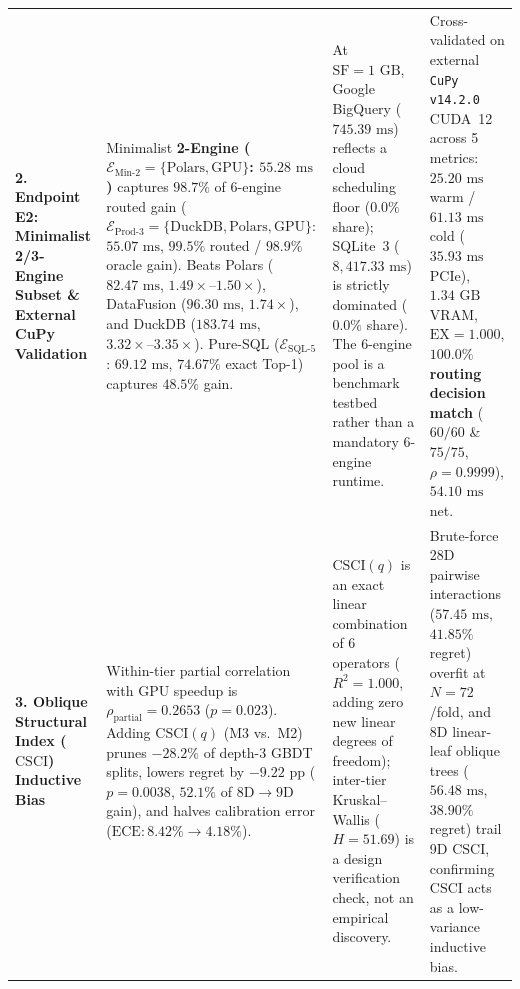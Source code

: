 \documentclass[10pt,a4paper]{article}
\newenvironment{fitasttable}{%
  \begin{lrbox}{\asttblbox}%
}{%
  \end{lrbox}%
  \sbox{\asttblboxB}{%
    \ifdim\wd\asttblbox>0.96\textwidth
      \resizebox{0.96\textwidth}{!}{\usebox{\asttblbox}}%
    \else
      \usebox{\asttblbox}%
    \fi
  }%
  \ifdim\ht\asttblboxB>0.72\textheight
    \resizebox{!}{0.72\textheight}{\usebox{\asttblboxB}}%
  \else
    \usebox{\asttblboxB}%
  \fi
}
\begin{document}
\begin{table}[!htbp]
{\begin{fitasttable}
\begin{tabular}{@{}p{2.6cm}p{4.6cm}p{4.3cm}p{4.5cm}@{}}
\textbf{2. Endpoint E2: Minimalist 2/3-Engine Subset \& External CuPy Validation} & Minimalist \textbf{2-Engine ($\mathcal{E}_{\text{Min-2}}=\{\text{Polars},\text{GPU}\}$: $55.28\text{ ms}$)} captures $\mathbf{98.7\%}$ of 6-engine routed gain ($\mathcal{E}_{\text{Prod-3}}=\{\text{DuckDB},\text{Polars},\text{GPU}\}$: $55.07\text{ ms}$, $\mathbf{99.5\%}$ routed / $\mathbf{98.9\%}$ oracle gain). Beats Polars ($82.47\text{ ms}$, $1.49\times\text{--}1.50\times$), DataFusion ($96.30\text{ ms}$, $1.74\times$), and DuckDB ($183.74\text{ ms}$, $3.32\times\text{--}3.35\times$). Pure-SQL ($\mathcal{E}_{\text{SQL-5}}$: $69.12\text{ ms}$, $74.67\%$ exact Top-1) captures $\mathbf{48.5\%}$ gain. & At $\text{SF}=1\text{ GB}$, Google BigQuery ($745.39\text{ ms}$) reflects a cloud scheduling floor ($0.0\%$ share); SQLite~3 ($8{,}417.33\text{ ms}$) is strictly dominated ($0.0\%$ share). The 6-engine pool is a benchmark testbed rather than a mandatory 6-engine runtime. & Cross-validated on external \texttt{CuPy v14.2.0} CUDA~12 across 5 metrics: $25.20\text{ ms}$ warm / $61.13\text{ ms}$ cold ($35.93\text{ ms}$ PCIe), $1.34\text{ GB}$ VRAM, $\text{EX}=1.000$, $\mathbf{100.0\%}$ \textbf{routing decision match} ($60/60$ \& $75/75$, $\rho=0.9999$), $54.10\text{ ms}$ net. \\
\textbf{3. Oblique Structural Index ($\text{CSCI}$) Inductive Bias} & Within-tier partial correlation with GPU speedup is $\rho_{\text{partial}}=0.2653$ ($p=0.023$). Adding $\text{CSCI}(q)$ (M3 vs.\ M2) prunes $-28.2\%$ of depth-3 GBDT splits, lowers regret by $-9.22\text{ pp}$ ($p=0.0038$, $52.1\%$ of $8\text{D}\rightarrow 9\text{D}$ gain), and halves calibration error ($\text{ECE}: 8.42\%\rightarrow 4.18\%$). & $\text{CSCI}(q)$ is an exact linear combination of 6 operators ($R^2=1.000$, adding zero new linear degrees of freedom); inter-tier Kruskal--Wallis ($H=51.69$) is a design verification check, not an empirical discovery. & Brute-force 28D pairwise interactions ($57.45\text{ ms}$, $41.85\%$ regret) overfit at $N=72$/fold, and 8D linear-leaf oblique trees ($56.48\text{ ms}$, $38.90\%$ regret) trail 9D $\text{CSCI}$, confirming $\text{CSCI}$ acts as a low-variance inductive bias. \\

\end{tabular}
\end{fitasttable}}
\end{table}
\end{document}
